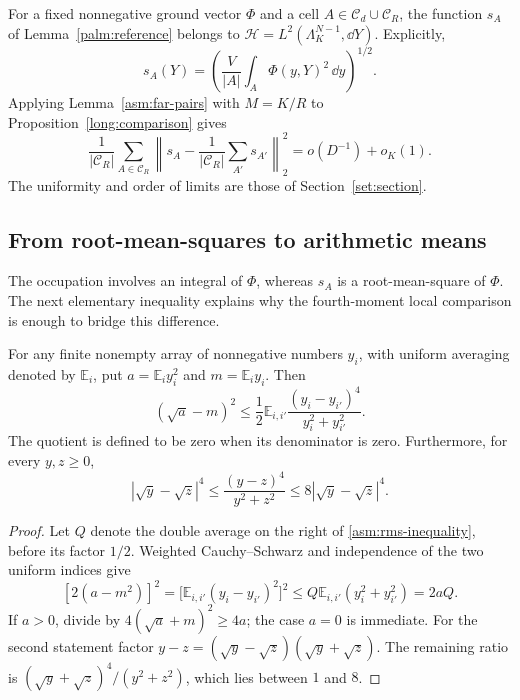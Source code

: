For a fixed nonnegative ground vector $\Phi$ and a cell
$A\in\mathcal C_d\cup\mathcal C_R$, the function $s_A$ of
Lemma~\ref{palm:reference} belongs to
$\mathcal H=L^2(\Lambda_K^{N-1},\dd Y)$. Explicitly,
\begin{equation}\label{asm:rms}
 s_A(Y)=\left(\frac V{|A|}\int_A\Phi(y,Y)^2\,\dd y\right)^{1/2}.
\end{equation}
Applying Lemma~\ref{asm:far-pairs} with $M=K/R$ to
Proposition~\ref{long:comparison} gives
\begin{equation}\label{asm:rms-variance}
 \frac1{|\mathcal C_R|}\sum_{A\in\mathcal C_R}
    \left\|s_A-\frac1{|\mathcal C_R|}\sum_{A'}s_{A'}\right\|_2^2
       =o(D^{-1})+o_K(1).
\end{equation}
The uniformity and order of limits are those of
Section~\ref{set:section}.

\subsection{From root-mean-squares to arithmetic means}

The occupation involves an integral of $\Phi$, whereas $s_A$ is a
root-mean-square of $\Phi$. The next elementary inequality explains why
the fourth-moment local comparison is enough to bridge this difference.

\begin{lemma}\label{asm:rms-interpolation}
For any finite nonempty array of nonnegative numbers $y_i$, with uniform
averaging denoted by $\mathbb E_i$, put
$a=\mathbb E_i y_i^2$ and $m=\mathbb E_i y_i$. Then
\begin{equation}\label{asm:rms-inequality}
 (\sqrt a-m)^2\le\frac12\mathbb E_{i,i'}
           \frac{(y_i-y_{i'})^4}{y_i^2+y_{i'}^2}.
\end{equation}
The quotient is defined to be zero when its denominator is zero.
Furthermore, for every $y,z\ge0$,
\begin{equation}\label{asm:sqrt-comparison}
 |\sqrt y-\sqrt z|^4
 \le\frac{(y-z)^4}{y^2+z^2}
 \le8|\sqrt y-\sqrt z|^4.
\end{equation}
\end{lemma}

\begin{proof}
Let $Q$ denote the double average on the right of
\eqref{asm:rms-inequality}, before its factor $1/2$. Weighted
Cauchy--Schwarz and independence of the two uniform indices give
\[
 [2(a-m^2)]^2
 =\bigl[\mathbb E_{i,i'}(y_i-y_{i'})^2\bigr]^2
 \le Q\mathbb E_{i,i'}(y_i^2+y_{i'}^2)=2aQ.
\]
If $a>0$, divide by $4(\sqrt a+m)^2\ge4a$; the case $a=0$ is
immediate. For the second statement factor
$y-z=(\sqrt y-\sqrt z)(\sqrt y+\sqrt z)$. The remaining ratio is
$(\sqrt y+\sqrt z)^4/(y^2+z^2)$, which lies between $1$ and $8$.
\end{proof}

